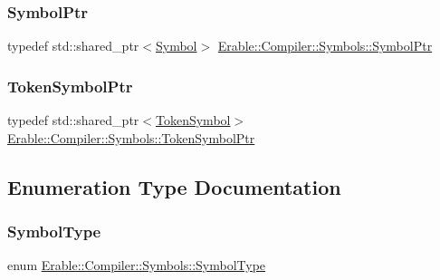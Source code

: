 \mbox{\label{namespace_erable_1_1_compiler_1_1_symbols_a8f0bc762f448ea4d84e8713ab3e140b9}} 
\subsubsection{\texorpdfstring{SymbolPtr}{SymbolPtr}}
{\footnotesize\ttfamily typedef std\+::shared\+\_\+ptr$<$\mbox{\hyperlink{class_erable_1_1_compiler_1_1_symbols_1_1_symbol}{Symbol}}$>$ \mbox{\hyperlink{namespace_erable_1_1_compiler_1_1_symbols_a8f0bc762f448ea4d84e8713ab3e140b9}{Erable\+::\+Compiler\+::\+Symbols\+::\+Symbol\+Ptr}}}

\mbox{\label{namespace_erable_1_1_compiler_1_1_symbols_a901387d440ee00c2282850e615ff8ffa}} 
\subsubsection{\texorpdfstring{TokenSymbolPtr}{TokenSymbolPtr}}
{\footnotesize\ttfamily typedef std\+::shared\+\_\+ptr$<$\mbox{\hyperlink{class_erable_1_1_compiler_1_1_symbols_1_1_token_symbol}{Token\+Symbol}}$>$ \mbox{\hyperlink{namespace_erable_1_1_compiler_1_1_symbols_a901387d440ee00c2282850e615ff8ffa}{Erable\+::\+Compiler\+::\+Symbols\+::\+Token\+Symbol\+Ptr}}}



\subsection{Enumeration Type Documentation}
\mbox{\label{namespace_erable_1_1_compiler_1_1_symbols_a3b60ec10cda0920ec4368128361b8320}} 
\subsubsection{\texorpdfstring{SymbolType}{SymbolType}}
{\footnotesize\ttfamily enum \mbox{\hyperlink{namespace_erable_1_1_compiler_1_1_symbols_a3b60ec10cda0920ec4368128361b8320}{Erable\+::\+Compiler\+::\+Symbols\+::\+Symbol\+Type}}\hspace{0.3cm}{\ttfamily [strong]}}

